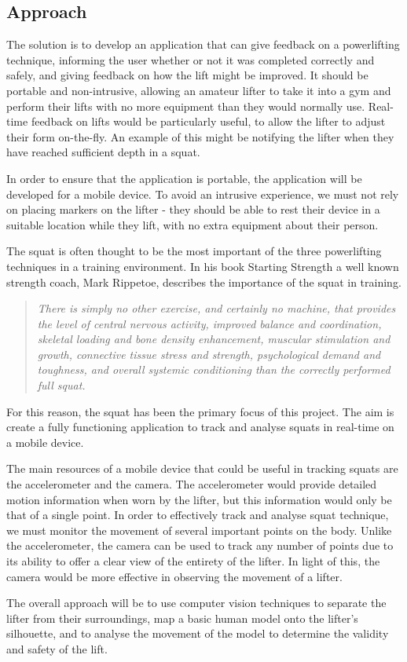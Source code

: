 \subsection{Approach}

The solution is to develop an application that can give feedback on a powerlifting technique, informing the user whether or not it was completed correctly and safely, and giving feedback on how the lift might be improved. It should be portable and non-intrusive, allowing an amateur lifter to take it into a gym and perform their lifts with no more equipment than they would normally use. Real-time feedback on lifts would be particularly useful, to allow the lifter to adjust their form on-the-fly. An example of this might be notifying the lifter when they have reached sufficient depth in a squat.

In order to ensure that the application is portable, the application will be developed for a mobile device. To avoid an intrusive experience, we must not rely on placing markers on the lifter - they should be able to rest their device in a suitable location while they lift, with no extra equipment about their person.

The squat is often thought to be the most important of the three powerlifting techniques in a training environment. In his book Starting Strength\cite{startingstrength} a well known strength coach, Mark Rippetoe, describes the importance of the squat in training.

\begin{quote}
\emph{There is simply no other exercise, and certainly no machine, that provides the level of central nervous activity, improved balance and coordination, skeletal loading and bone density enhancement, muscular stimulation and growth, connective tissue stress and strength, psychological demand and toughness, and overall systemic conditioning than the correctly performed full squat.}
\end{quote}

For this reason, the squat has been the primary focus of this project. The aim is create a fully functioning application to track and analyse squats in real-time on a mobile device.

The main resources of a mobile device that could be useful in tracking squats are the accelerometer and the camera. The accelerometer would provide detailed motion information when worn by the lifter, but this information would only be that of a single point. In order to effectively track and analyse squat technique, we must monitor the movement of several important points on the body. Unlike the accelerometer, the camera can be used to track any number of points due to its ability to offer a clear view of the entirety of the lifter. In light of this, the camera would be more effective in observing the movement of a lifter.

The overall approach will be to use computer vision techniques to separate the lifter from their surroundings, map a basic human model onto the lifter's silhouette, and to analyse the movement of the model to determine the validity and safety of the lift.

